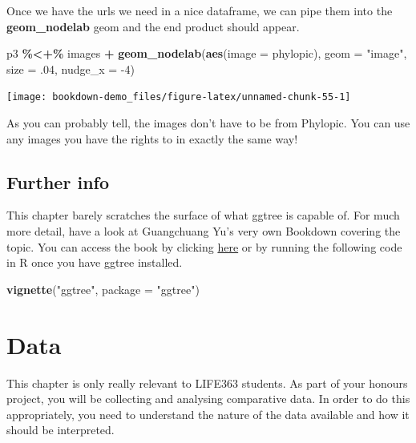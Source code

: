 \documentclass[
]{book}
\newenvironment{Shaded}{\begin{snugshade}}{\end{snugshade}}
\newcommand{\DataTypeTok}[1]{\textcolor[rgb]{0.13,0.29,0.53}{#1}}
\newcommand{\DecValTok}[1]{\textcolor[rgb]{0.00,0.00,0.81}{#1}}
\newcommand{\FloatTok}[1]{\textcolor[rgb]{0.00,0.00,0.81}{#1}}
\newcommand{\KeywordTok}[1]{\textcolor[rgb]{0.13,0.29,0.53}{\textbf{#1}}}
\newcommand{\NormalTok}[1]{#1}
\newcommand{\OperatorTok}[1]{\textcolor[rgb]{0.81,0.36,0.00}{\textbf{#1}}}
\newcommand{\StringTok}[1]{\textcolor[rgb]{0.31,0.60,0.02}{#1}}
\begin{document}
Once we have the urls we need in a nice dataframe, we can pipe them into the \textbf{geom\_nodelab} geom and the end product should appear.

\begin{Shaded}
\begin{Highlighting}[]
\NormalTok{p3 }\OperatorTok{\%\textless{}+\%}\StringTok{ }\NormalTok{images }\OperatorTok{+}
\StringTok{  }\KeywordTok{geom\_nodelab}\NormalTok{(}\KeywordTok{aes}\NormalTok{(}\DataTypeTok{image =}\NormalTok{ phylopic), }\DataTypeTok{geom =} \StringTok{"image"}\NormalTok{, }\DataTypeTok{size =} \FloatTok{.04}\NormalTok{, }\DataTypeTok{nudge\_x =} \DecValTok{{-}4}\NormalTok{)}
\end{Highlighting}
\end{Shaded}

\begin{center}\texttt{[image: bookdown-demo\_files/figure-latex/unnamed-chunk-55-1]} \end{center}

As you can probably tell, the images don't have to be from Phylopic. You can use any images you have the rights to in exactly the same way!

\hypertarget{further-info-1}{%
\section{Further info}\label{further-info-1}}

This chapter barely scratches the surface of what ggtree is capable of. For much more detail, have a look at Guangchuang Yu's very own Bookdown covering the topic. You can access the book by clicking \href{https://yulab-smu.github.io/treedata-book/}{here} or by running the following code in R once you have ggtree installed.

\begin{Shaded}
\begin{Highlighting}[]
\KeywordTok{vignette}\NormalTok{(}\StringTok{"ggtree"}\NormalTok{, }\DataTypeTok{package =} \StringTok{"ggtree"}\NormalTok{)}
\end{Highlighting}
\end{Shaded}

\hypertarget{data}{%
\chapter{Data}\label{data}}

This chapter is only really relevant to LIFE363 students. As part of your honours project, you will be collecting and analysing comparative data. In order to do this appropriately, you need to understand the nature of the data available and how it should be interpreted.
\end{document}
